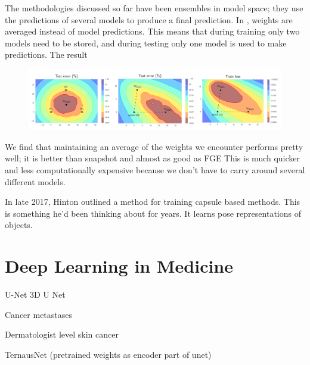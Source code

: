 The methodologies discussed so far have been ensembles in model space; they use the predictions of several models to produce a final prediction.
In \cite{Izmailov_Podoprikhin_Garipov_Vetrov_Wilson_2018}, weights are averaged instead of model predictions.
This means that during training only two models need to be stored, and during testing only one model is used to make predictions.
The result 

\begin{figure}[hbtp!]
    \centering
    \includegraphics[width=\textwidth]{./img/SWA.png}
    \caption{\cite{Izmailov_Podoprikhin_Garipov_Vetrov_Wilson_2018}}
    \label{fig:SWA}
\end{figure}



We find that maintaining an average of the weights we encounter performs pretty well; it is better than snapshot and almost as good as FGE
This is much quicker and less computationally expensive because we don't have to carry around several different models. \cite{Izmailov_Podoprikhin_Garipov_Vetrov_Wilson_2018}


In late 2017, Hinton outlined a method for training capsule based methods.
This is something he'd been thinking about for years.
It learns pose representations of objects. \cite{Hinton_Sabour_Frosst_2018, Sabour_Frosst_Hinton_2017}





\section{Deep Learning in Medicine}\label{deep_learning_medic_lit}
U-Net \cite{Ronneberger_Fischer_Brox_2015}
3D U Net \cite{Cicek_Abdulkadir_Lienkamp_Brox_Ronneberger_2016}

Cancer metastases \cite{Liu_Gadepalli_Norouzi_Dahl_Kohlberger_Boyko_Venugopalan_Timofeev_Nelson_Corrado_et_al_2017}

Dermatologist level skin cancer \cite{Esteva_Kuprel_Novoa_Ko_Swetter_Blau_Thrun_2017}

TernausNet (pretrained weights as encoder part of unet) \cite{Iglovikov_Shvets_2018}
